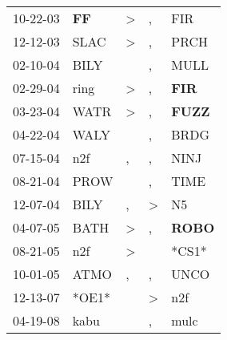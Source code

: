 \begin{supertabular}{p{0.07\textwidth}p{0.06\textwidth}p{0.02\textwidth}p{0.02\textwidth}p{0.06\textwidth}}
          10-22-03\textsuperscript{} &    \textbf{FF\textsuperscript{}} &     \textgreater &                , &            FIR\textsuperscript{} \\
          12-12-03\textsuperscript{} &           SLAC\textsuperscript{} &     \textgreater &                , &           PRCH\textsuperscript{} \\
          02-10-04\textsuperscript{} &           BILY\textsuperscript{} &                  &                , &           MULL\textsuperscript{} \\
          02-29-04\textsuperscript{} &           ring\textsuperscript{} &     \textgreater &                , &   \textbf{FIR\textsuperscript{}} \\
          03-23-04\textsuperscript{} &           WATR\textsuperscript{} &     \textgreater &                , &  \textbf{FUZZ\textsuperscript{}} \\
          04-22-04\textsuperscript{} &           WALY\textsuperscript{} &                  &                , &           BRDG\textsuperscript{} \\
          07-15-04\textsuperscript{} &            n2f\textsuperscript{} &                , &                , &           NINJ\textsuperscript{} \\
          08-21-04\textsuperscript{} &           PROW\textsuperscript{} &                  &                , &           TIME\textsuperscript{} \\
          12-07-04\textsuperscript{} &           BILY\textsuperscript{} &                , &     \textgreater &             N5\textsuperscript{} \\
          04-07-05\textsuperscript{} &           BATH\textsuperscript{} &     \textgreater &                , &  \textbf{ROBO\textsuperscript{}} \\
          08-21-05\textsuperscript{} &            n2f\textsuperscript{} &     \textgreater &                  &                            *CS1* \\
          10-01-05\textsuperscript{} &           ATMO\textsuperscript{} &                , &                , &           UNCO\textsuperscript{} \\
          12-13-07\textsuperscript{} &                            *OE1* &                  &     \textgreater &            n2f\textsuperscript{} \\
          04-19-08\textsuperscript{} &           kabu\textsuperscript{} &                  &                , &           mulc\textsuperscript{} \\

\end{supertabular}
